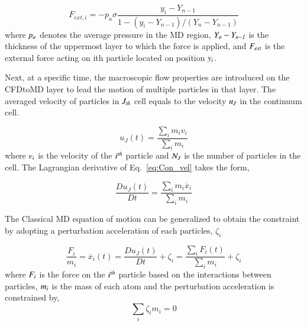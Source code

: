 \documentclass[preprint,12pt]{elsarticle}
\begin{document}
\vspace{-.2em}
\begin{equation}
 F_{ext, i} = -p_{a}\sigma\frac{y_{i}-Y_{n-1}}{1-(y_{i}-Y_{n-1})/(Y_{n}-Y_{n-1})}
 \label{eq:External_Force}
\end{equation}
\normalsize
where  $\it p_{a}$ denotes the average pressure in the MD region, $\it Y_{n}-Y_{n-1}$ is the thickness of the uppermost layer to which the force is applied, and $\it F_{ext}$ is the external force acting on ith particle located on position $\it y_{i}$.


Next, at a specific time, the macroscopic flow properties are introduced on the CFDtoMD layer to lead the motion of multiple particles in that layer. The averaged velocity of particles in $\it J_{th}$ cell equals to the velocity $\it u_{J}$ in the continuum cell.


\vspace{-.2em}
\begin{equation}
 u_{J}(t) = \frac {\displaystyle\sum_{i} m_{i} v_{i}} {\displaystyle\sum_{i} m_{i}}
 \label{eq:Con_vel}
\end{equation}
\normalsize
where $\it v_{i}$ is the velocity of the $\it i^{th}$ particle and $\it N_{J}$ is the number of particles in the cell. The Lagrangian derivative of Eq.~\ref{eq:Con_vel} takes the form,

\vspace{-.2em}
\begin{equation}
 \frac{Du_{J}(t)}{Dt} = \frac {\displaystyle\sum_{i} m_{i} \ddot{x_{i}}} {\displaystyle\sum_{i} m_{i}}
 \label{eq:Lagrangian}
\end{equation}
\normalsize

The Classical MD equation of motion can be generalized to obtain the constraint by adopting a perturbation acceleration of each particles, $\zeta_{i}$

\vspace{-.2em}
\begin{equation}
 \frac{F_{i}}{m_{i}} = \ddot{x_{i}}(t)  =   \frac{Du_{J}(t)}{Dt} + \zeta_{i} = \frac{\displaystyle\sum_{i}F_{i}(t)} {\displaystyle\sum_{i}m_{i}} +   \zeta_{i}
 \label{eq:Con2}
\end{equation}
\normalsize
where $\it F_{i}$ is the force on the $\it i^{th}$ particle based on the interactions between particles, $\it m_{i}$ is the mass of each atom and the perturbation acceleration is constrained by,
\vspace{-.2em}
\begin{equation}
\displaystyle\sum_{i}\zeta_{i}m_{i} = 0
 \label{eq:Con2}
\end{equation}
\normalsize
\end{document}

